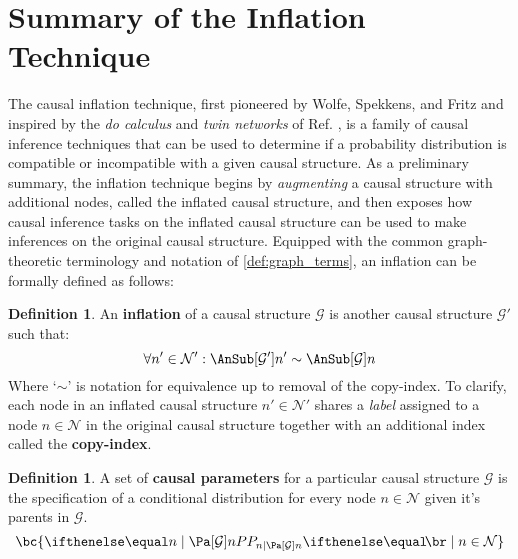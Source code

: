 \documentclass[aps, 10pt, english, twoside, pra, longbibliography]{revtex4-1}
\theoremstyle{plain}
\theoremstyle{definition}
\newtheorem{definition}[theorem]{Definition}
\theoremstyle{remark}
\newcommand{\graph}{\mathcal{G}}
\newcommand{\nodes}{\mathcal{N}}
\newcommand{\term}[1]{\textcolor{Mahogany}{\textbf{#1}}}
\begin{document}
    \section{Summary of the Inflation Technique}
    The causal inflation technique, first pioneered by Wolfe, Spekkens, and Fritz \cite{Inflation} and inspired by the \textit{do calculus} and \textit{twin networks} of Ref. \cite{Pearl_2009}, is a family of causal inference techniques that can be used to determine if a probability distribution is compatible or incompatible with a given causal structure. As a preliminary summary, the inflation technique begins by \textit{augmenting} a causal structure with additional nodes, called the inflated causal structure, and then exposes how causal inference tasks on the inflated causal structure can be used to make inferences on the original causal structure. Equipped with the common graph-theoretic terminology and notation of \cref{def:graph_terms}, an inflation can be formally defined as follows:
    \begin{definition}
        An \term{inflation} of a causal structure $\graph$ is another causal structure $\graph'$ such that:
        \[ \forall n' \in \nodes' : \AnSub[\graph']{n'} \sim \AnSub[\graph]{n} \]
        Where `$\sim$' is notation for equivalence up to removal of the copy-index. To clarify, each node in an inflated causal structure $n' \in \nodes'$ shares a \textit{label} assigned to a node $n \in \nodes$ in the original causal structure together with an additional index called the \term{copy-index}.
    \end{definition}
    \begin{definition}
        A set of \term{causal parameters} for a particular causal structure $\graph$ is the specification of a conditional distribution for every node $n \in \nodes$ given it's parents in $\graph$.
        \[ \bc{\prob[n \mid \Pa[\graph]{n}] \mid n \in \nodes} \]
    \end{definition}
\end{document}
